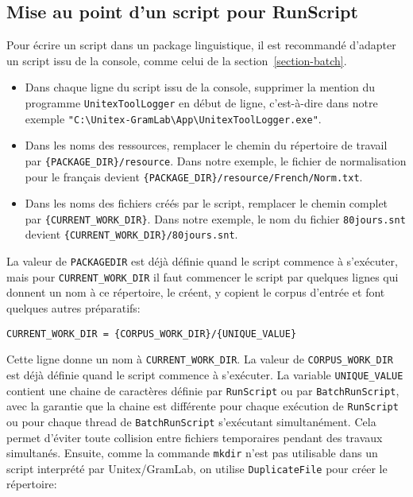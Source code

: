 \subsection{Mise au point d'un script pour RunScript}
\label{section-script-for-runscript}
Pour écrire un script dans un package linguistique, il est recommandé d'adapter un script issu
de la console, comme celui de la section~\ref{section-batch}.

\begin{itemize}     
\item Dans chaque ligne du script issu de la console, supprimer la mention du programme
\verb$UnitexToolLogger$ en début de ligne, c'est-à-dire dans notre exemple
\verb$"C:\Unitex-GramLab\App\UnitexToolLogger.exe"$.
\item Dans les noms des ressources, remplacer le chemin du répertoire de travail par
\verb${PACKAGE_DIR}/resource$. Dans notre exemple, le fichier de normalisation pour le français
devient \verb${PACKAGE_DIR}/resource/French/Norm.txt$.
\item Dans les noms des fichiers créés par le script, remplacer le chemin complet par
\verb${CURRENT_WORK_DIR}$. Dans notre exemple, le nom du fichier \verb$80jours.snt$ devient
\verb${CURRENT_WORK_DIR}/80jours.snt$.
\end{itemize}

\noindent La valeur de \verb$PACKAGEDIR$ est déjà définie quand le script commence à s'exécuter,
mais pour \verb$CURRENT_WORK_DIR$ il faut commencer le script par quelques lignes qui donnent un
nom à ce répertoire, le créent, y copient le corpus d'entrée et font quelques autres préparatifs:

\begin{Verbatim}[fontsize=\small,fontfamily=helvetica]
CURRENT_WORK_DIR = {CORPUS_WORK_DIR}/{UNIQUE_VALUE}
\end{Verbatim}

\noindent Cette ligne donne un nom à \verb$CURRENT_WORK_DIR$. La valeur de
\verb$CORPUS_WORK_DIR$ est déjà définie quand le script commence à s'exécuter. La variable
\verb$UNIQUE_VALUE$ contient une chaine de caractères définie par \verb$RunScript$ ou par
\verb$BatchRunScript$, avec la garantie que la chaine est différente pour chaque exécution de
\verb$RunScript$ ou pour chaque thread de \verb$BatchRunScript$ s’exécutant simultanément. Cela
permet d'éviter toute collision entre fichiers temporaires pendant des travaux simultanés. Ensuite,
comme la commande \verb$mkdir$ n’est pas utilisable dans un script interprété par Unitex/GramLab, on
utilise \verb$DuplicateFile$ pour créer le répertoire:


